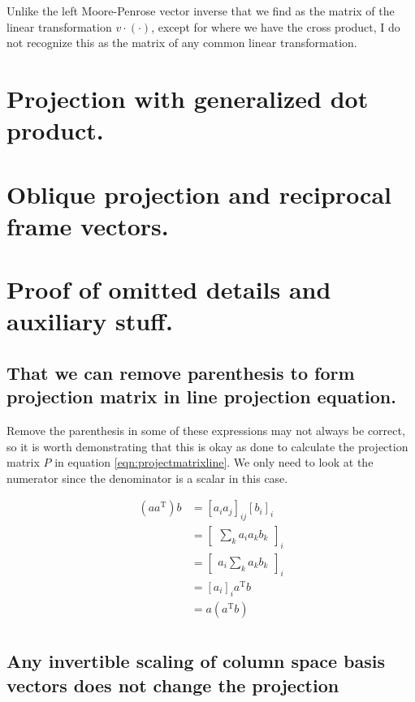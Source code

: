 \documentclass{article}      %
\newcommand{\T}[0]{\text{T}}
\begin{document}
Unlike the left Moore-Penrose vector inverse that we find as the matrix of the linear transformation $v \cdot ( \cdot )$, except for  where we have the cross product, I do not recognize this as the matrix of any common linear transformation.

\section{ Projection with generalized dot product. }

\section{ Oblique projection and reciprocal frame vectors. }





\section{ Proof of omitted details and auxiliary stuff. }

\subsection{ That we can remove parenthesis to form projection matrix in line projection equation. }

Remove the parenthesis in some of these expressions may not always be correct, so it is worth demonstrating that this is okay as
done to calculate the projection matrix $P$ in 
equation \ref{eqn:projectmatrixline}.
We only need to look at the numerator since the denominator is a scalar in this case.

\begin{align*}
(a a^\T) b
&= [ a_i a_j ]_{ij} [b_i]_i \\
&= 
{\begin{bmatrix}
\sum_k a_i a_k b_k
\end{bmatrix}
}_i \\
&= 
{\begin{bmatrix}
a_i \sum_k a_k b_k
\end{bmatrix}
}_i \\
&= [ a_i ]_i a^\T b \\
&= a (a^\T b) \\
\end{align*}



\subsection{ Any invertible scaling of column space basis vectors does not change the projection }
\end{document}
